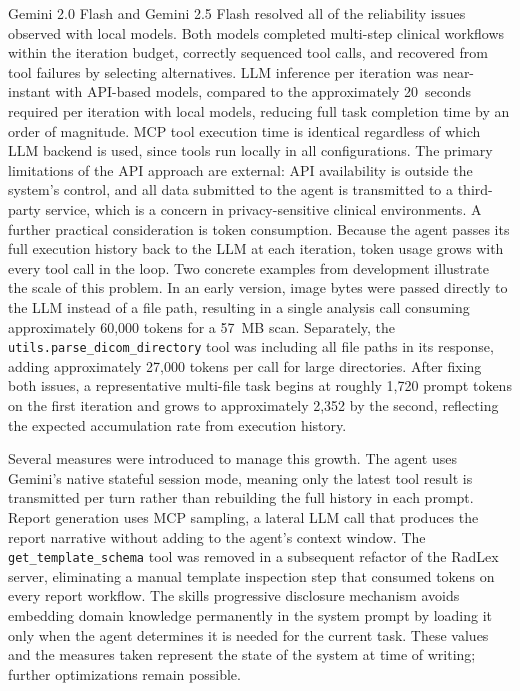 \documentclass[conference]{IEEEtran}
\begin{document}
Gemini 2.0 Flash and Gemini 2.5 Flash resolved all of the reliability issues observed with local models. Both models completed multi-step clinical workflows within the iteration budget, correctly sequenced tool calls, and recovered from tool failures by selecting alternatives.
LLM inference per iteration was near-instant with API-based models, compared to the approximately 20~seconds required per iteration with local models, reducing full task completion time by an order of magnitude. MCP tool execution time is identical regardless of which LLM backend is used, since tools run locally in all configurations. The primary limitations of the API approach are external: API availability is outside the system's control, and all data submitted to the agent is transmitted to a third-party service, which is a concern in privacy-sensitive clinical environments. A further practical consideration is token consumption. Because the agent passes its full execution history back to the LLM at each iteration, token usage grows with every tool call in the loop. Two concrete examples from development illustrate the scale of this problem. In an early version, image bytes were passed directly to the LLM instead of a file path, resulting in a single analysis call consuming approximately 60,000 tokens for a 57~MB scan. Separately, the \texttt{utils.parse\_dicom\_directory} tool was including all file paths in its response, adding approximately 27,000 tokens per call for large directories. After fixing both issues, a representative multi-file task begins at roughly 1,720 prompt tokens on the first iteration and grows to approximately 2,352 by the second, reflecting the expected accumulation rate from execution history.

Several measures were introduced to manage this growth. The agent uses Gemini's native stateful session mode, meaning only the latest tool result is transmitted per turn rather than rebuilding the full history in each prompt. Report generation uses MCP sampling, a lateral LLM call that produces the report narrative without adding to the agent's context window.
The \texttt{get\_template\_schema} tool was removed in a subsequent refactor of the RadLex server, eliminating a manual template inspection step that consumed tokens on every report workflow.
The skills progressive disclosure mechanism avoids embedding domain knowledge permanently in the system prompt by loading it only when the agent determines it is needed for the current task. These values and the measures taken represent the state of the system at time of writing; further optimizations remain possible.
\end{document}
